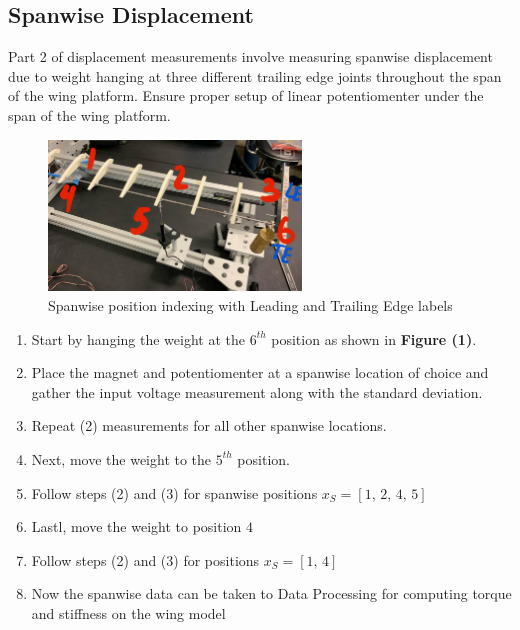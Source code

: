 \documentclass{article}
\begin{document}
  \subsection{Spanwise Displacement}
  Part 2 of displacement measurements involve measuring spanwise displacement due to weight hanging at three different trailing edge joints throughout the span of the wing platform. Ensure proper setup of linear potentiomenter under the span of the wing platform. 
  \begin{figure}
    \centering
    \includegraphics[width = 0.6\textwidth]{lab3images/SpanwiseLocations.jpg}
    \caption{Spanwise position indexing with Leading and Trailing Edge labels}
  \end{figure}
  
  \begin{enumerate}
    \item Start by hanging the weight at the $6^{th}$ position as shown in \textbf{Figure (1)}. 
    \vspace{2.5mm}

    \item Place the magnet and potentiomenter at a spanwise location of choice and gather the input voltage measurement along with the standard deviation.
    \vspace{2.5mm}

    \item Repeat (2) measurements for all other spanwise locations.
    \vspace{2.5mm}

    \item Next, move the weight to the $5^{th}$ position.
    \vspace{2.5mm}

    \item Follow steps (2) and (3) for spanwise positions $x_{S} = \left[1,\, 2,\, 4,\, 5\right]$
    \vspace{2.5mm}

    \item Lastl, move the weight to position $4$
    \vspace{2.5mm}

    \item Follow steps (2) and (3) for positions $x_{S} = \left[1,\, 4\right]$
    \vspace{2.5mm}
    
    \item Now the spanwise data can be taken to Data Processing for computing torque and stiffness on the wing model
  \end{enumerate}
\end{document}
